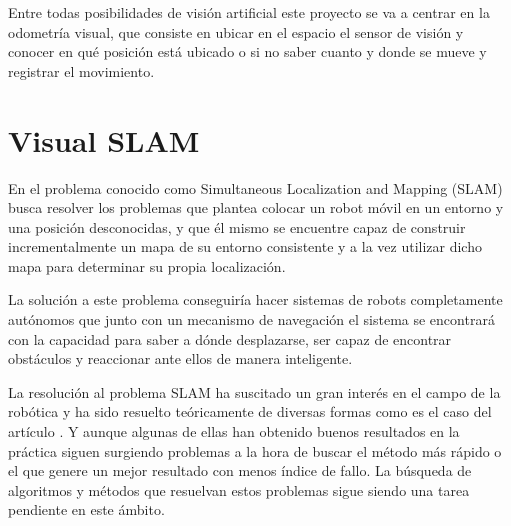 Entre todas posibilidades de visión artificial este proyecto se va a centrar en la odometría visual, que consiste en ubicar en el espacio el sensor de visión y conocer en qué posición está ubicado o si no saber cuanto y donde se mueve y registrar el movimiento.

\section{Visual SLAM}

En el problema conocido como Simultaneous Localization and Mapping (SLAM) busca resolver los problemas que plantea colocar un robot móvil en un entorno y una posición desconocidas, y que él mismo se encuentre capaz de construir incrementalmente un mapa de su entorno consistente y a la vez utilizar dicho mapa para determinar su propia localización.

La solución a este problema conseguiría hacer sistemas de robots completamente autónomos que junto con un mecanismo de navegación el sistema se encontrará con la capacidad para saber a dónde desplazarse, ser capaz de encontrar obstáculos y reaccionar ante ellos de manera inteligente.

La resolución al problema SLAM ha suscitado un gran interés en el campo de la robótica y ha sido resuelto teóricamente de diversas formas como es el caso del artículo \parencite{Reference1}. Y aunque algunas de ellas han obtenido buenos resultados en la práctica siguen surgiendo problemas a la hora de buscar el método más rápido o el que genere un mejor resultado con menos índice de fallo. La búsqueda de algoritmos y métodos que resuelvan estos problemas sigue siendo una tarea pendiente en este ámbito.

